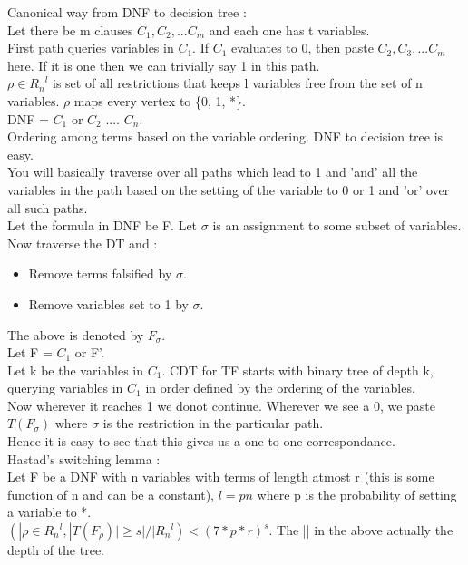 \documentclass[solution,addpoints,12pt]{exam}
\begin{document}
Canonical way from DNF to decision tree :\\
Let there be m clauses $C_1, C_2, ... C_m$ and each one has t variables.\\
First path queries variables in $C_1$. If $C_1$ evaluates to 0, then
paste $C_2, C_3, ... C_m$ here. If it is one then we can trivially say
1 in this path.\\
$\rho \in {R_n}^l$ is set of all restrictions that keeps l variables free from the
set of n variables. $\rho$ maps every vertex to \{0, 1, *\}.\\
DNF = $C_1$ or $C_2$ .... $C_n$.\\
Ordering among terms based on the variable ordering. DNF to decision tree is
easy.\\
You will basically traverse over all paths which lead to 1 and 'and' all the
variables in the path based on the setting of the variable to 0 or 1 and
'or' over all such paths.\\
Let the formula in DNF be F.
Let $\sigma$ is an assignment to some subset of variables. Now traverse
the DT and :\\
\begin{itemize}
\item Remove terms falsified by $\sigma$.
\item Remove variables set to 1 by $\sigma$.
\end{itemize}
The above is denoted by $F_{\sigma}$.\\

Let F = $C_1$ or F'.\\
Let k be the variables in $C_1$. CDT for TF starts with binary
tree of depth k, querying variables in $C_1$ in order defined by the ordering of the variables.\\
Now wherever it reaches 1 we donot continue. Wherever we see a 0, we paste $T(F_{\sigma})$
where $\sigma$ is the restriction in the particular path.\\
Hence it is easy to see that this gives us a one to one correspondance.\\

Hastad's switching lemma :\\
Let F be a DNF with n variables with terms of length atmost r (this is some function of n
and can be a constant),
$l = pn$ where p is the probability of setting a variable to *.\\
$(|\rho \in {R_n}^l, |T(F_{\rho})| \ge s|/|{R_n}^l) < {(7*p*r)}^s$.
The || in the above actually the depth of the tree.\\
\end{document}
